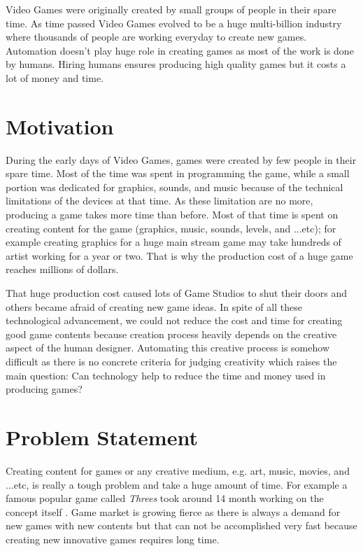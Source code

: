 Video Games were originally created by small groups of people in their spare time. As time passed Video Games evolved to be a huge multi-billion industry where thousands of people are working everyday to create new games. Automation doesn't play huge role in creating games as most of the work is done by humans. Hiring humans ensures producing high quality games but it costs a lot of money and time.

\section{Motivation}
During the early days of Video Games, games were created by few people in their spare time. Most of the time was spent in programming the game, while a small portion was dedicated for graphics, sounds, and music because of the technical limitations of the devices at that time. As these limitation are no more, producing a game takes more time than before. Most of that time is spent on creating content for the game (graphics, music, sounds, levels, and ...etc)\cite{budgetAAA}; for example creating graphics for a huge main stream game may take hundreds of artist working for a year or two. That is why the production cost of a huge game reaches millions of dollars\cite{gameCost}.\\\par

That huge production cost caused lots of Game Studios to shut their doors \cite{gameCloses} and others became afraid of creating new game ideas. In spite of all these technological advancement, we could not reduce the cost and time for creating good game contents because creation process heavily depends on the creative aspect of the human designer. Automating this creative process is somehow difficult as there is no concrete criteria for judging creativity which raises the main question: Can technology help to reduce the time and money used in producing games?

\section{Problem Statement}
Creating content for games or any creative medium, e.g. art, music, movies, and ...etc, is really a tough problem and take a huge amount of time. For example a famous popular game called \emph{Threes} took around 14 month working on the concept itself \cite{threesTime}. Game market is growing fierce as there is always a demand for new games with new contents but that can not be accomplished very fast because creating new innovative games requires long time.\\\par


